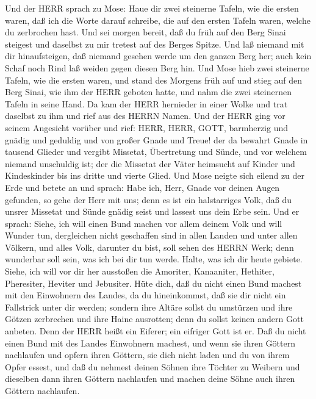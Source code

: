  Und der HERR sprach zu Mose: Haue dir zwei steinerne
Tafeln, wie die ersten waren, daß ich die Worte darauf schreibe, die auf
den ersten Tafeln waren, welche du zerbrochen hast.  Und sei
morgen bereit, daß du früh auf den Berg Sinai steigest und daselbst zu
mir tretest auf des Berges Spitze.  Und laß niemand mit dir
hinaufsteigen, daß niemand gesehen werde um den ganzen Berg her; auch
kein Schaf noch Rind laß weiden gegen diesen Berg hin.  Und
Mose hieb zwei steinerne Tafeln, wie die ersten waren, und stand des
Morgens früh auf und stieg auf den Berg Sinai, wie ihm der HERR geboten
hatte, und nahm die zwei steinernen Tafeln in seine Hand. 
Da kam der HERR hernieder in einer Wolke und trat daselbst zu ihm und
rief aus des HERRN Namen.  Und der HERR ging vor seinem
Angesicht vorüber und rief: HERR, HERR, GOTT, barmherzig und gnädig und
geduldig und von großer Gnade und Treue!  der da bewahrt
Gnade in tausend Glieder und vergibt Missetat, Übertretung und Sünde,
und vor welchem niemand unschuldig ist; der die Missetat der Väter
heimsucht auf Kinder und Kindeskinder bis ins dritte und vierte Glied.
 Und Mose neigte sich eilend zu der Erde und betete an
 und sprach: Habe ich, Herr, Gnade vor deinen Augen
gefunden, so gehe der Herr mit uns; denn es ist ein halstarriges Volk,
daß du unsrer Missetat und Sünde gnädig seist und lassest uns dein Erbe
sein.  Und er sprach: Siehe, ich will einen Bund machen vor
allem deinem Volk und will Wunder tun, dergleichen nicht geschaffen sind
in allen Landen und unter allen Völkern, und alles Volk, darunter du
bist, soll sehen des HERRN Werk; denn wunderbar soll sein, was ich bei
dir tun werde.  Halte, was ich dir heute gebiete. Siehe,
ich will vor dir her ausstoßen die Amoriter, Kanaaniter, Hethiter,
Pheresiter, Heviter und Jebusiter.  Hüte dich, daß du nicht
einen Bund machest mit den Einwohnern des Landes, da du hineinkommst,
daß sie dir nicht ein Fallstrick unter dir werden;  sondern
ihre Altäre sollst du umstürzen und ihre Götzen zerbrechen und ihre
Haine ausrotten;  denn du sollst keinen andern Gott
anbeten. Denn der HERR heißt ein Eiferer; ein eifriger Gott ist er.
 Daß du nicht einen Bund mit des Landes Einwohnern machest,
und wenn sie ihren Göttern nachlaufen und opfern ihren Göttern, sie dich
nicht laden und du von ihrem Opfer essest,  und daß du
nehmest deinen Söhnen ihre Töchter zu Weibern und dieselben dann ihren
Göttern nachlaufen und machen deine Söhne auch ihren Göttern nachlaufen.
